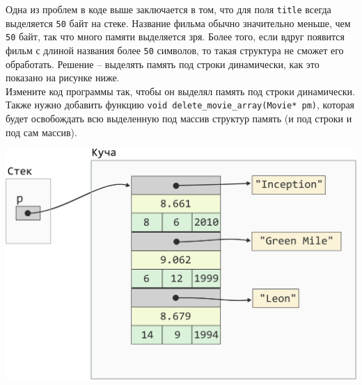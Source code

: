 \documentclass{article}
\begin{document}
\vspace{65ex}
Одна из проблем в коде выше заключается в том, что для поля \texttt{title} всегда
выделяется \texttt{50} байт на стеке. Название фильма обычно значительно меньше, чем \texttt{50} байт, так что 
много памяти выделяется зря. Более того, если вдруг появится фильм с длиной названия более \texttt{50} символов, то такая структура не сможет его обработать. Решение -- выделять память под строки динамически, как это
показано на рисунке ниже. \\
Измените код программы так, чтобы он выделял память под строки 
динамически. Также нужно добавить функцию \texttt{void delete\_movie\_array(Movie* pm)}, которая будет
освобождать всю выделенную под массив структур память (и под строки и под сам массив).


\begin{center}
\includegraphics[scale=0.9]{../images/pointer_schemes/pointer_to_array_of_struct_movie_charpointers.png}
\end{center}
\end{document}
